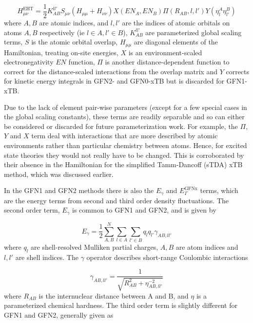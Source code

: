 \begin{equation}
H_{\mu\nu}^{\text{EHT}} = \frac{1}{2} K_{AB}^{ll'}S_{\mu\nu}\left(H_{\mu\mu} + H_{\nu\nu}\right)X\left(EN_A, EN_B\right)\Pi\left(R_{AB}, l, l'\right)Y\left(\eta^A_l\eta^B_{l'}\right)
\end{equation}
%
where $A,B$ are atomic indices, and $l,l'$ are the indices of atomic orbitals on 
atoms $A, B$ respectively (ie $l \in A, l' \in B$), $K_{AB}^{ll'}$ are parameterized global 
scaling terms, $S$ is the atomic orbital overlap, $H_{\mu\mu}$ are diagonal elements
of the Hamiltonian, treating on-site energies, $X$ is an environment-scaled electronegativity
$EN$ function, $\Pi$ is another distance-dependent function to correct for the distance-scaled
interactions from the overlap matrix and $Y$ corrects for kinetic energy integrals
in GFN2- and GFN0-xTB but is discarded for GFN1-xTB.

Due to the lack of element pair-wise parameters (except for a few special cases 
in the global scaling constants), these terms are readily separable and so can either 
be considered or discarded for future parameterization work. For example, the $\Pi$,
$Y$ and $X$ term deal with interactions that are more described by atomic environments 
rather than particular chemistry between atoms. Hence, for excited state theories they 
would not really have to be changed. This is corroborated by their absence in the 
Hamiltonian for the simplified Tamm-Dancoff (sTDA) xTB \cite{Grimme2016} method, 
which was discussed earlier.

In the GFN1 and GFN2 methods there is also the $E_\gamma$ and $E_\Gamma^{\text{GFNx}}$ 
terms, which are the energy terms from second and third order density fluctuations. 
The second order term, $E_\gamma$ is common to GFN1 and GFN2, and is given by

\begin{equation}
E_\gamma = \frac{1}{2} \sum^{N}_{A,B} \sum_{l \in A} \sum_{l' \in B} q_l q_{l'} \gamma_{AB, ll'}
\end{equation}
%
where $q_l$ are shell-resolved Mulliken partial charges, $A,B$ are atom indices 
and $l,l'$ are shell indices. The $\gamma$ operator describes short-range Coulombic 
interactions

\begin{equation}
\gamma_{AB, ll'} = \frac{1}{\sqrt{R^2_{AB} + \eta^{-2}_{AB, ll'}}}
\end{equation}
%
where $R_{AB}$ is the internuclear distance between A and B, and $\eta$ is a parameterized 
chemical hardness. The third order term is slightly different for GFN1 and GFN2,
generally given as

